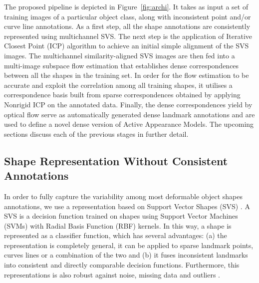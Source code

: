 The proposed pipeline is depicted in Figure~\ref{fig:archi}. It takes as input a set of training images of a particular object class, along with inconsistent point and/or curve line annotations.
As a first step, all the shape annotations are consistently represented using multichannel SVS.
The next step is the application of Iterative Closest Point (ICP) algorithm \cite{Besl1992} to achieve an initial simple alignment of the SVS images.
The multichannel similarity-aligned SVS images are then fed into a multi-image subspace flow estimation that establishes dense correspondences between all the shapes in the training set. In order for the flow estimation to be accurate and exploit the correlation among all training shapes, it utilises a correspondence basis built from sparse correspondences obtained by applying Nonrigid ICP on the annotated data. Finally, the dense correspondences yield by optical flow serve as automatically generated dense landmark annotations and are used to define a novel dense version of Active Appearance Models. The upcoming sections discuss each of the previous stages in further detail.

\subsection{Shape Representation Without Consistent Annotations}
\label{sec:svs}

In order to fully capture the variability among most deformable object shapes annotations, we use a representation based on Support Vector Shapes (SVS) \cite{Nguyen2013}. A SVS is a decision function trained on shapes using Support Vector Machines (SVMs) with Radial Basis Function (RBF) kernels. In this way, a shape is represented as a classifier function, which has several advantages: (a) the representation is completely general, \eg it can be applied to sparse landmark points, curves lines or a combination of the two and (b) it fuses inconsistent landmarks into consistent and directly comparable decision functions. Furthermore, this representations is also robust against noise, missing data and outliers \cite{Nguyen2013}.

